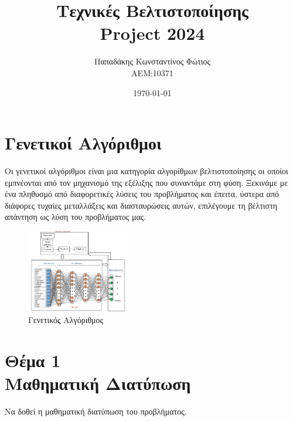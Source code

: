 \documentclass[twocolumn]{report}
\begin{document}

\title{\Huge \bfseries Τεχνικές Βελτιστοποίησης \\ Project 2024} %
\author{Παπαδάκης Κωνσταντίνος Φώτιος\vspace{0.5cm} \\  ΑΕΜ:10371} %
\date{\today}
\maketitle

\section*{Γενετικοί Αλγόριθμοι}
Οι γενετικοί αλγόριθμοι είναι μια κατηγορία αλγορίθμων βελτιστοποίησης οι
οποίοι εμπνέονται από τον μηχανισμό της εξέλιξης που συναντάμε στη φύση.
Ξεκινάμε με ένα πληθυσμό από διαφορετικές λύσεις του προβλήματος και έπειτα, 
ύστερα από διάφορες τυχαίες μεταλλάξεις και διασταυρώσεις αυτών, επιλέγουμε 
τη βέλτιστη απάντηση ως λύση του προβλήματος μας.
\begin{figure}[H]
    \centering
    \includegraphics[width=0.4\textwidth]{media/genetic_algorithm.png}
    \caption{Γενετικός Αλγόριθμος}
\end{figure}

\section*{Θέμα 1\\Μαθηματική Διατύπωση}
Να δοθεί η μαθηματική διατύπωση του προβλήματος.
\end{document}
